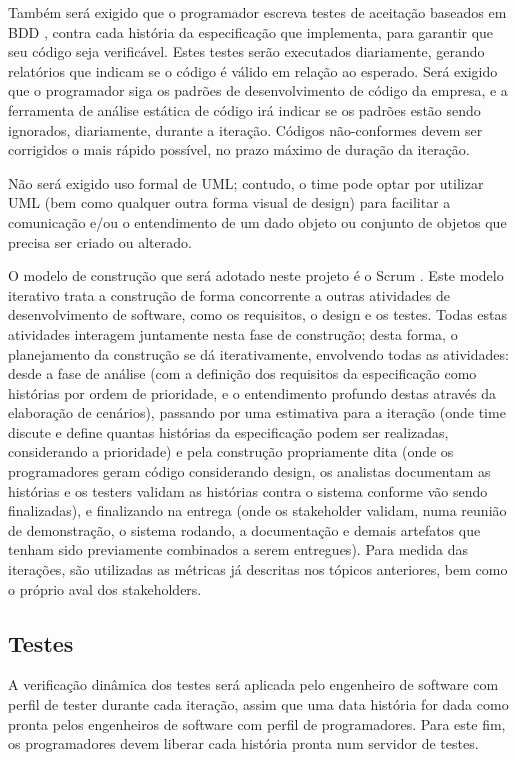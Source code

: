 \documentclass[12pt,journal,compsoc]{IEEEtran}
\begin{document}
Também será exigido que o programador escreva testes de aceitação baseados em BDD \cite{chelimsky2010rspec}, contra cada história da especificação que implementa, para garantir que seu código seja verificável. Estes testes serão executados diariamente, gerando relatórios que indicam se o código é válido em relação ao esperado. Será exigido que o programador siga os padrões de desenvolvimento de código da empresa, e a ferramenta de análise estática de código irá indicar se os padrões estão sendo ignorados, diariamente, durante a iteração. Códigos não-conformes devem ser corrigidos o mais rápido possível, no prazo máximo de duração da iteração.

Não será exigido uso formal de UML; contudo, o time pode optar por utilizar UML (bem como qualquer outra forma visual de design) para facilitar a comunicação e/ou o entendimento de um dado objeto ou conjunto de objetos que precisa ser criado ou alterado. 

O modelo de construção que será adotado neste projeto é o Scrum
\cite{schwaber_scrum_2013}. Este modelo iterativo trata a construção de forma
concorrente a outras atividades de desenvolvimento de software, como os
requisitos, o design e os testes. Todas estas atividades interagem juntamente
nesta fase de construção; desta forma, o planejamento da construção se dá
iterativamente, envolvendo todas as atividades: desde a fase de análise (com a
definição dos requisitos da especificação como histórias por ordem de
prioridade, e o entendimento profundo destas através da elaboração de
cenários), passando por  uma estimativa para a iteração (onde time discute e
define quantas histórias da especificação podem ser realizadas, considerando a
prioridade) e pela construção propriamente dita (onde os programadores geram
código considerando design, os analistas documentam as histórias e os testers
validam as histórias contra o sistema conforme vão sendo finalizadas), e
finalizando na entrega (onde os stakeholder validam, numa reunião de
demonstração, o sistema rodando, a documentação e demais artefatos que tenham
sido previamente combinados a serem entregues).  Para medida das iterações, são
utilizadas as métricas já descritas nos tópicos anteriores, bem como o próprio
aval dos stakeholders.


\subsection{Testes}

A verificação dinâmica dos testes será aplicada pelo engenheiro de software com perfil de tester durante cada iteração, assim que uma data história for dada como pronta pelos engenheiros de software com perfil de programadores. Para este fim, os programadores devem liberar cada história pronta num servidor de testes.
\end{document}
